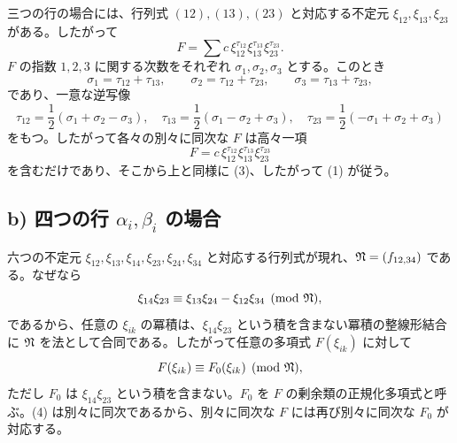 \documentclass[11pt]{article}
\begin{document}
三つの行の場合には、行列式 \((12),(13),(23)\) と対応する不定元 \(\xi_{12},\xi_{13},\xi_{23}\) がある。したがって
\[
        F=\sum c\,\xi_{12}^{\tau_{12}}\xi_{13}^{\tau_{13}}\xi_{23}^{\tau_{23}}.
\]
\(F\) の指数 \(1,2,3\) に関する次数をそれぞれ \(\sigma_1,\sigma_2,\sigma_3\) とする。このとき
\[
        \sigma_1=\tau_{12}+\tau_{13},\qquad
        \sigma_2=\tau_{12}+\tau_{23},\qquad
        \sigma_3=\tau_{13}+\tau_{23},
\]
であり、一意な逆写像
\[
        \tau_{12}=\frac12(\sigma_1+\sigma_2-\sigma_3),\quad
        \tau_{13}=\frac12(\sigma_1-\sigma_2+\sigma_3),\quad
        \tau_{23}=\frac12(-\sigma_1+\sigma_2+\sigma_3)
\]
をもつ。したがって各々の別々に同次な \(F\) は高々一項
\[
        F=c\,\xi_{12}^{\tau_{12}}\xi_{13}^{\tau_{13}}\xi_{23}^{\tau_{23}}
\]
を含むだけであり、そこから上と同様に (3)、したがって (1) が従う。

\subsection*{b) 四つの行 \(\alpha_i,\beta_i\) の場合}

六つの不定元 \(\xi_{12},\xi_{13},\xi_{14},\xi_{23},\xi_{24},\xi_{34}\) と対応する行列式が現れ、\(\mathfrak N=(f_{12,34})\) である。なぜなら
\begin{equation}
        \xi_{14}\xi_{23}\equiv \xi_{13}\xi_{24}-\xi_{12}\xi_{34}\pmod{\mathfrak N},
\end{equation}
であるから、任意の \(\xi_{ik}\) の冪積は、\(\xi_{14}\xi_{23}\) という積を含まない冪積の整線形結合に \(\mathfrak N\) を法として合同である。したがって任意の多項式 \(F(\xi_{ik})\) に対して
\begin{equation}
        F(\xi_{ik})\equiv F_0(\xi_{ik})\pmod{\mathfrak N},
\end{equation}
ただし \(F_0\) は \(\xi_{14}\xi_{23}\) という積を含まない。\(F_0\) を \(F\) の剰余類の正規化多項式と呼ぶ。(4) は別々に同次であるから、別々に同次な \(F\) には再び別々に同次な \(F_0\) が対応する。
\end{document}
